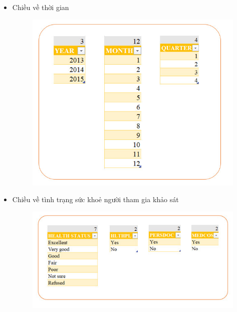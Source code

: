 \begin{itemize}
    \item Chiều về thời gian
    \begin{center}
            \begin{figure}[!h]
                \centering
                \includegraphics[scale = 0.6]{van/dim_tg.png}
            \end{figure}
    \end{center}
    \item Chiều về tình trạng sức khoẻ người tham gia khảo sát
    \begin{center}
            \begin{figure}[!h]
                \centering
                \includegraphics[scale = 0.6]{van/dim_sk.png}
            \end{figure}
    \end{center}

\end{itemize}
